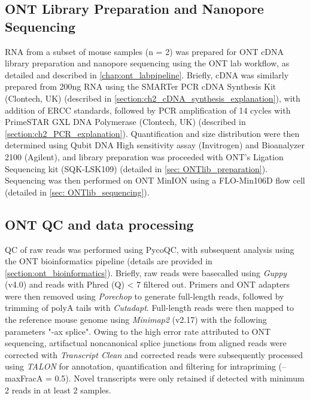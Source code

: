 \subsection{ONT Library Preparation and Nanopore Sequencing}
RNA from a subset of mouse samples (n = 2) was prepared for ONT cDNA library preparation and nanopore sequencing using the ONT lab workflow, as detailed and described in \cref{chap:ont_labpipeline}. Briefly, cDNA was similarly prepared from 200ng RNA using the SMARTer PCR cDNA Synthesis Kit (Clontech, UK) (described in \cref{section:ch2_cDNA_synthesis_explanation}), with addition of ERCC standards, followed by PCR amplification of 14 cycles with PrimeSTAR GXL DNA Polymerase (Clontech, UK) (described in \cref{section:ch2_PCR_explanation}). Quantification and size distribution were then determined using Qubit DNA High sensitivity assay (Invitrogen) and Bioanalyzer 2100 (Agilent), and library preparation was proceeded with ONT’s Ligation Sequencing kit (SQK-LSK109) (detailed in \cref{sec: ONTlib_preparation}). Sequencing was then performed on ONT MinION using a FLO-Min106D flow cell (detailed in \cref{sec: ONTlib_sequencing}). 

\subsection{ONT QC and data processing}
QC of raw reads was performed using PycoQC, with subsequent analysis using the ONT bioinformatics pipeline (details are provided in \cref{section:ont_bioinformatics}). Briefly, raw reads were basecalled using \textit{Guppy} (v4.0) and reads with Phred (Q) < 7 filtered out. Primers and ONT adapters were then removed using \textit{Porechop} to generate full-length reads, followed by trimming of polyA tails with \textit{Cutadapt}. Full-length reads were then mapped to the reference mouse genome using \textit{Minimap2} (v2.17) with the following parameters "-ax splice". Owing to the high error rate attributed to ONT sequencing, artifactual noncanonical splice junctions from aligned reads were corrected with \textit{Transcript Clean} and corrected reads were subsequently processed using \textit{TALON} for annotation, quantification and filtering for intrapriming (--maxFracA = 0.5). Novel transcripts were only retained if detected with minimum 2 reads in at least 2 samples. 
 

